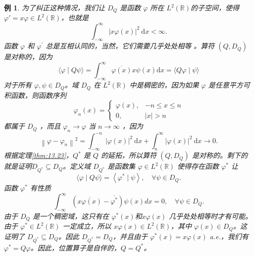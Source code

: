 \documentclass[hyperref,UTF8]{ctexbook}
\newtheorem{eg}{例}[chapter]
\begin{document}
\begin{eg}
为了纠正这种情况，我们让 \(D_{Q}\) 是函数 \(\varphi\) 所在 \(L^{2}(\mathbb{R})\)的子空间，使得\(\varphi'=x\varphi \in L^{2}(\mathbb{R})\)，也就是
\[\int_{-\infty}^{\infty}|x \varphi(x)|^{2} \mathrm{~d} x<\infty .\]
函数 \(\varphi\) 和 \(\varphi^{\prime}\) 总是互相认同的，当然，它们需要几乎处处相等 。算符 \(\left(Q, D_{Q}\right) \) 是对称的，因为
\[
\langle\varphi \mid Q \psi\rangle=\int_{-\infty}^{\infty} \overline{\varphi(x)} x \psi(x) \mathrm{d} x=\langle Q \varphi \mid \psi\rangle
\]
对于所有 \(\varphi, \psi \in D_{Q}\)。域 \(D_{Q}\) 在 \(L^{2}(\mathbb{R})\) 中是稠密的，因为如果 \(\varphi\) 是任意平方可积函数，则函数序列
\[
\varphi_{n}(x)=\begin{cases}
\varphi(x), & -n \leq x \leq n \\
0, & |x|>n
\end{cases}
\]
都属于 \(D_{Q}\) ，而且 \(\varphi_{n} \rightarrow \varphi\) 当 \(n \rightarrow \infty\) ，因为
\[
\left\|\varphi-\varphi_{n}\right\|^{2}=\int_{-\infty}^{-n}|\varphi(x)|^{2} \mathrm{~d} x+\int_{n}^{\infty}|\varphi(x)|^{2} \mathrm{~d} x \rightarrow 0 .
\]
根据定理\ref{thm:13.23}，\(Q^{*}\) 是 \(Q\) 的延拓，所以算符 \(\left(Q, D_{Q}\right)\) 是对称的。剩下的就是证明\(D_{Q^{*}}\subseteq D_{Q}\)。定义域 \(D_{Q^{*}}\) 是函数集 \(\varphi \in L^{2}(\mathbb{R})\) 使得存在函数 \(\varphi^ {*}\) 让
\[
\langle\varphi \mid Q \psi\rangle=\left\langle\varphi^{*} \mid \psi\right\rangle, \quad \forall \psi \in D_{Q} .
\]
函数 \(\varphi^{*}\) 有性质
\[
\int_{-\infty}^{\infty}\left(\overline{x \varphi(x)}-\overline{\varphi^{*}}\right) \psi(x) d x=0, \quad \forall \psi \in D_{Q} .
\]
由于 \(D_{Q}\) 是一个稠密域，这只有在 \(\varphi^{*}(x)\)和\(x \varphi(x)\) 几乎处处相等时才有可能。由于 \(\varphi^{*} \in L^{2}(\mathbb{R})\) 一定成立，所以 \(x \varphi(x) \in L^{2}(\mathbb{R })\)，其中 \(\varphi(x) \in D_{Q}\)。这证明了 \(D_{Q^{*}} \subseteq D_{Q}\)。因此 \(D_{Q^{*}}=D_{Q}\)，并且由于 \(\varphi^{*}(x)=x \varphi(x)\) a.e.，我们有 \(\varphi^ {*}=Q \varphi\)。因此，位置算子是自伴的，\(Q=Q^{*}\)。

\end{eg}
\end{document}
